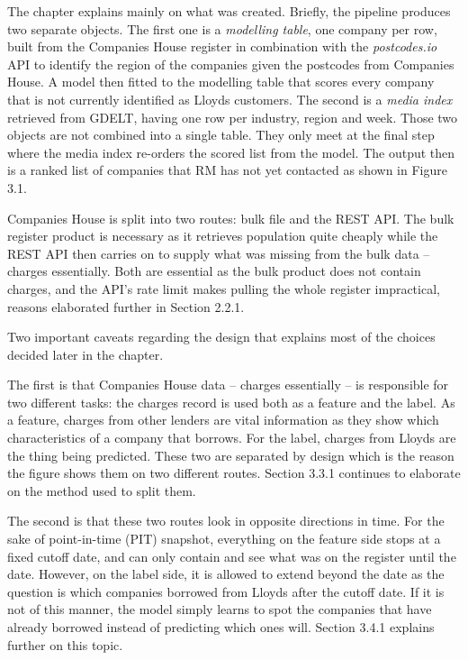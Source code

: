 \documentclass[ %
                    author={Natchalin Iwsakul \\ Inkaphol Siriwongwattana \\ Tanaphan Kummaraphat \\ Patorn Srisupap},
                supervisor={Fernando Moreno-Pino},
                    degree={MSc},
                     title={Propensity Modelling for SME Commercial Lending Using Open Public Data},
                  subtitle={Companies House filings and GDELT media coverage as predictors of first-time borrowing},
                      type={},
                      year={2026}]{dissertation}
\begin{document}
The chapter explains mainly on what was created. Briefly, the pipeline produces two separate objects. The first one is a \textit{modelling table}, one company per row, built from the Companies House register in combination with the \textit{postcodes.io} API to identify the region of the companies given the postcodes from Companies House. A model then fitted to the modelling table that scores every company that is not currently identified as Lloyds customers. The second is a \textit{media index} retrieved from GDELT, having one row per industry, region and week. Those two objects are not combined into a single table. They only meet at the final step where the media index re-orders the scored list from the model. The output then is a ranked list of companies that RM has not yet contacted as shown in Figure 3.1.

Companies House is split into two routes: bulk file and the REST API. The bulk register product is necessary as it retrieves population quite cheaply while the REST API then carries on to supply what was missing from the bulk data -- charges essentially. Both are essential as the bulk product does not contain charges, and the API's rate limit makes pulling the whole register impractical, reasons elaborated further in Section 2.2.1.

Two important caveats regarding the design that explains most of the choices decided later in the chapter.

The first is that Companies House data -- charges essentially -- is responsible for two different tasks: the charges record is used both as a feature and the label. As a feature, charges from other lenders are vital information as they show which characteristics of a company that borrows. For the label, charges from Lloyds are the thing being predicted. These two are separated by design which is the reason the figure shows them on two different routes. Section 3.3.1 continues to elaborate on the method used to split them.

The second is that these two routes look in opposite directions in time. For the sake of point-in-time (PIT) snapshot, everything on the feature side stops at a fixed cutoff date, and can only contain and see what was on the register until the date. However, on the label side, it is allowed to extend beyond the date as the question is which companies borrowed from Lloyds after the cutoff date. If it is not of this manner, the model simply learns to spot the companies that have already borrowed instead of predicting which ones will. Section 3.4.1 explains further on this topic.
\end{document}
